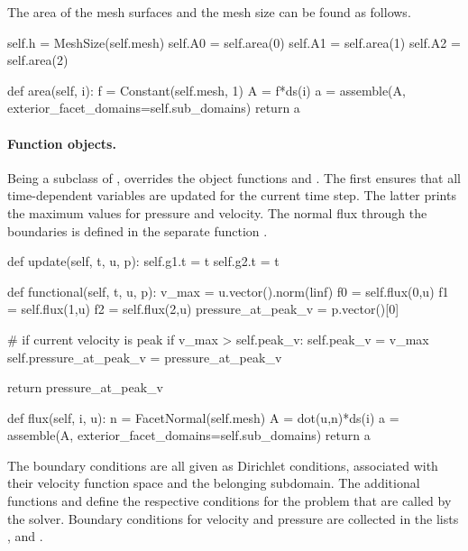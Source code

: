 The area of the mesh surfaces and the mesh size can be found as follows.
\begin{python}
	self.h = MeshSize(self.mesh)
	self.A0 = self.area(0)
	self.A1 = self.area(1)
	self.A2 = self.area(2)

def area(self, i):
	f = Constant(self.mesh, 1)
	A = f*ds(i)
	a = assemble(A, exterior_facet_domains=self.sub_domains)
	return a
\end{python}

\paragraph{Function objects.}
Being a subclass of ,  overrides the
object functions  and . The first ensures
that all time-dependent variables are updated for the current time
step. The latter prints the maximum values for pressure and
velocity. The normal flux through the boundaries is defined in the
separate function .
\begin{python}
def update(self, t, u, p):
	self.g1.t = t
	self.g2.t = t

def functional(self, t, u, p):
	v_max = u.vector().norm(linf)
	f0 = self.flux(0,u)
	f1 = self.flux(1,u)
	f2 = self.flux(2,u)
	pressure_at_peak_v = p.vector()[0]

	# if current velocity is peak
	if v_max > self.peak_v:
		self.peak_v = v_max
		self.pressure_at_peak_v = pressure_at_peak_v

	return pressure_at_peak_v

def flux(self, i, u):
	n = FacetNormal(self.mesh)
	A = dot(u,n)*ds(i)
	a = assemble(A, exterior_facet_domains=self.sub_domains)
	return a
\end{python}

The boundary conditions are all given as Dirichlet conditions,
associated with their velocity function space and the belonging
subdomain. The additional functions  and
 define the respective conditions for the
problem that are called by the solver. Boundary conditions for
velocity and pressure are collected in the lists ,
 and .

